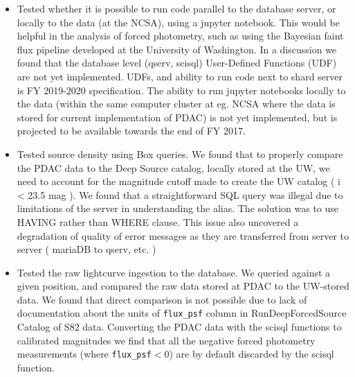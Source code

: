 \documentclass[DM,lsstdraft,toc,usenatbib]{lsstdoc}
\begin{document}
\begin{itemize}
	\item Tested whether it is possible to run code parallel to the database server,  or locally to the data (at the NCSA), using a jupyter notebook.  This would be helpful in the analysis of forced photometry, such as using the Bayesian faint flux pipeline developed at the University of Washington. In a discussion we found that the database level (qserv, scisql) User-Defined Functions (UDF) are not yet implemented. UDFs, and ability to run code next to shard server is  FY  2019-2020 specification.  The ability to run jupyter notebooks locally to the data (within the same computer cluster at eg. NCSA where the data is stored for current implementation of PDAC) is not yet implemented, but is projected to be available towards the end of FY 2017.

	\item  Tested source density using Box queries. We found that to properly compare the PDAC data to the Deep Source catalog, locally stored at the UW, we need to account for the magnitude cutoff made to create the UW catalog ( i < 23.5 mag ). We found that a straightforward SQL query was illegal due to limitations of the server in understanding the alias. The solution was to use HAVING rather than WHERE clause. This issue also uncovered a degradation of quality of error messages as they are transferred from server to server ( mariaDB to qserv, etc. )

    \item  Tested the raw lightcurve ingestion to the database. We queried against a given position, and compared the raw data stored at PDAC to the UW-stored data.  We found that direct comparison is not possible due to lack of documentation about the units of \verb|flux_psf| column in RunDeepForcedSource Catalog of S82 data. Converting the PDAC data with the scisql  functions to calibrated magnitudes we find that all the negative forced photometry measurements  (where \verb|flux_psf|$<0$) are by default discarded by the scisql function. 


 \end{itemize}   


%
% 
\end{document}
